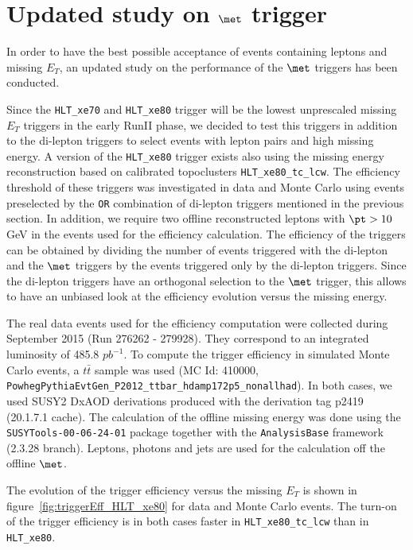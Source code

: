 \clearpage

\section{Updated study on $\met$ trigger}
\label{ap:met_update}

In order to have the best possible acceptance of events containing leptons and missing $E_T$, an updated study on the performance of the $\met$ triggers has been conducted.

Since the \texttt{HLT\_xe70} and \texttt{HLT\_xe80} trigger will be the lowest unprescaled missing $E_T$ triggers in the early RunII phase, we decided to test this triggers in addition to the di-lepton triggers to select events with lepton pairs and high missing energy. A version of the \texttt{HLT\_xe80} trigger exists also using the missing energy reconstruction based on calibrated topoclusters \texttt{HLT\_xe80\_tc\_lcw}. The efficiency threshold of these triggers was investigated in data and Monte Carlo using events preselected by the \texttt{OR} combination of di-lepton triggers mentioned in the previous section. In addition, we require two offline reconstructed leptons with $\pt > 10 $ GeV in the events used for the efficiency calculation. The efficiency of the triggers can be obtained by dividing the number of events triggered with the di-lepton and the $\met$ triggers by the events triggered only by the di-lepton triggers. Since the di-lepton triggers have an orthogonal selection to the $\met$ trigger, this allows to have an unbiased look at the efficiency evolution versus the missing energy.

The real data events used for the efficiency computation were collected during September 2015 (Run 276262 - 279928). They correspond to an integrated luminosity of 485.8 $pb^{-1}$. To compute the trigger efficiency in simulated Monte Carlo events, a $t\bar{t}$ sample was used (MC Id: 410000, \texttt{PowhegPythiaEvtGen\_P2012\_ttbar\_hdamp172p5\_nonallhad}). In both cases, we used SUSY2 DxAOD derivations produced with the derivation tag p2419 (20.1.7.1 cache). The calculation of the offline missing energy was done using the \texttt{SUSYTools-00-06-24-01} package together with the \texttt{AnalysisBase} framework (2.3.28 branch). Leptons, photons and jets are used for the calculation off the offline $\met$.

The evolution of the trigger efficiency versus the missing $E_T$ is shown in figure~\ref{fig:triggerEff_HLT_xe80} for data and Monte Carlo events. The turn-on of the trigger efficiency is in both cases faster in \texttt{HLT\_xe80\_tc\_lcw} than in \texttt{HLT\_xe80}. 

